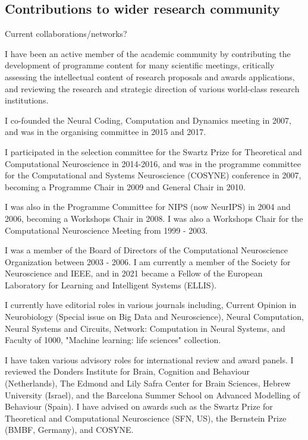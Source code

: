 \subsection{Contributions to wider research community}

Current collaborations/networks?

I have been an active member of the academic community by contributing the development of programme content for many scientific meetings, critically assessing the intellectual content of research proposals and awards applications, and reviewing the research and strategic direction of various world-class research institutions. 

I co-founded the Neural Coding, Computation and Dynamics meeting in 2007, and was in the organising committee in 2015 and 2017. 

I participated in the selection committee for the Swartz Prize for Theoretical and Computational Neuroscience in 2014-2016, and was in the programme committee for the Computational and Systems Neuroscience (COSYNE) conference in 2007, becoming a  Programme Chair in 2009 and General Chair in 2010. 

I was also in the Programme Committee for NIPS (now NeurIPS) in 2004 and 2006, becoming a Workshops Chair in 2008. I was also a Workshops Chair for the Computational Neuroscience Meeting from 1999 - 2003. 

I was a member of the Board of Directors of the Computational Neuroscience Organization between 2003 - 2006. I am currently a member of the Society for Neuroscience and IEEE, and in 2021 became a Fellow of the European Laboratory for Learning and Intelligent Systems (ELLIS). 

I currently have editorial roles in various journals including, Current Opinion in Neurobiology (Special issue on Big Data and Neuroscience), Neural Computation, Neural Systems and Circuits, Network:
Computation in Neural Systems, and Faculty of
1000, "Machine learning: life sciences" collection. 

I have taken various advisory roles for international review and award panels. I reviewed the Donders Institute for Brain, Cognition and Behaviour (Netherlands), The Edmond and Lily Safra Center for Brain Sciences, Hebrew
University (Israel), and the Barcelona Summer School on Advanced Modelling of Behaviour (Spain). I have advised on awards such as the Swartz Prize for Theoretical and Computational Neuroscience (SFN, US), the Bernstein Prize (BMBF, Germany), and COSYNE.

